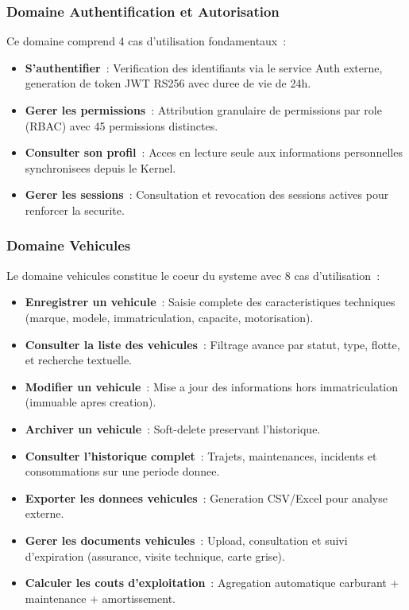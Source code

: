 \documentclass[12pt,a4paper]{report}
\begin{document}
\subsubsection{Domaine Authentification et Autorisation}

Ce domaine comprend 4 cas d'utilisation fondamentaux~:
\begin{itemize}[leftmargin=2cm]
  \item \textbf{S'authentifier}~: Verification des identifiants via le service
        Auth externe, generation de token JWT RS256 avec duree de vie de 24h.
  \item \textbf{Gerer les permissions}~: Attribution granulaire de permissions
        par role (RBAC) avec 45 permissions distinctes.
  \item \textbf{Consulter son profil}~: Acces en lecture seule aux informations
        personnelles synchronisees depuis le Kernel.
  \item \textbf{Gerer les sessions}~: Consultation et revocation des sessions
        actives pour renforcer la securite.
\end{itemize}

\subsubsection{Domaine Vehicules}

Le domaine vehicules constitue le coeur du systeme avec 8 cas d'utilisation~:
\begin{itemize}[leftmargin=2cm]
  \item \textbf{Enregistrer un vehicule}~: Saisie complete des caracteristiques
        techniques (marque, modele, immatriculation, capacite, motorisation).
  \item \textbf{Consulter la liste des vehicules}~: Filtrage avance par statut,
        type, flotte, et recherche textuelle.
  \item \textbf{Modifier un vehicule}~: Mise a jour des informations hors
        immatriculation (immuable apres creation).
  \item \textbf{Archiver un vehicule}~: Soft-delete preservant l'historique.
  \item \textbf{Consulter l'historique complet}~: Trajets, maintenances,
        incidents et consommations sur une periode donnee.
  \item \textbf{Exporter les donnees vehicules}~: Generation CSV/Excel pour
        analyse externe.
  \item \textbf{Gerer les documents vehicules}~: Upload, consultation et
        suivi d'expiration (assurance, visite technique, carte grise).
  \item \textbf{Calculer les couts d'exploitation}~: Agregation automatique
        carburant + maintenance + amortissement.
\end{itemize}
\end{document}
